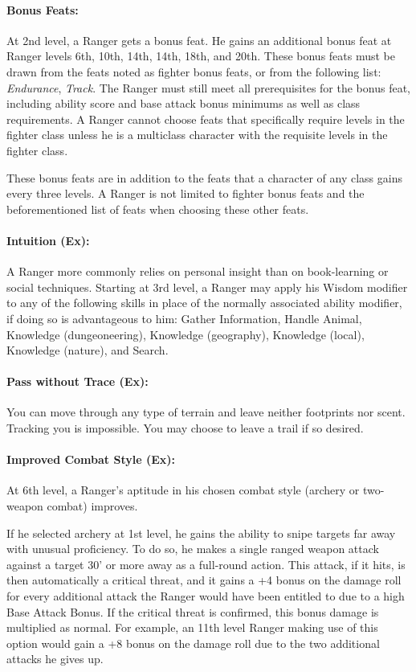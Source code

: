 \paragraph{Bonus Feats:}
At 2nd level, a Ranger gets a bonus feat.
He gains an additional bonus feat at Ranger levels 6th, 10th, 14th, 14th, 18th, and 20th. 
These bonus feats must be drawn from the feats noted as fighter bonus feats, or from the following list: \emph{Endurance}, \emph{Track}. 
The Ranger must still meet all prerequisites for the bonus feat, including ability score and base attack bonus minimums as well as class requirements. 
A Ranger cannot choose feats that specifically require levels in the fighter class unless he is a multiclass character with the requisite levels in the fighter class.

These bonus feats are in addition to the feats that a character of any class gains every three levels. 
A Ranger is not limited to fighter bonus feats and the beforementioned list of feats when choosing these other feats.
\paragraph{Intuition (Ex):}
A Ranger more commonly relies on personal insight than on book-learning or social techniques.
Starting at 3rd level, a Ranger may apply his Wisdom modifier to any of the following skills in place of the normally associated ability modifier, if doing so is advantageous to him:
Gather Information, Handle Animal, Knowledge (dungeoneering), Knowledge (geography), Knowledge (local), Knowledge (nature), and Search.

\paragraph{Pass without Trace (Ex):}
You can move through any type of terrain and leave neither footprints nor scent. Tracking you is impossible. You may choose to leave a trail if so desired.

\paragraph{Improved Combat Style (Ex):}
At 6th level, a Ranger's aptitude in his chosen combat style (archery or two-weapon combat) improves.

If he selected archery at 1st level, he gains the ability to snipe targets far away with unusual proficiency.
To do so, he makes a single ranged weapon attack against a target 30' or more away as a full-round action.
This attack, if it hits, is then automatically a critical threat, and it gains a +4 bonus on the damage roll for every additional attack the Ranger would have been entitled to due to a high Base Attack Bonus. If the critical threat is confirmed, this bonus damage is multiplied as normal. 
For example, an 11th level Ranger making use of this option would gain a +8 bonus on the damage roll due to the two additional attacks he gives up.

